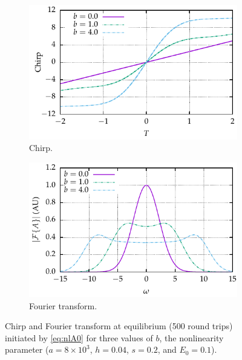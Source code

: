 \documentclass[9pt,twocolumn,twoside]{osajnl}
\begin{document}
\begin{figure}[tbp]
	\centering
	\begin{subfigure}{\columnwidth}
		\centering
		\includegraphics{Figures/Chirp}
		\caption{Chirp.}
		\label{fig:chirp}
	\end{subfigure} %
	\begin{subfigure}{\columnwidth}
		\centering
		\includegraphics{Figures/FT}
		\caption{Fourier transform.}
		\label{fig:ft}
	\end{subfigure}
	\caption{Chirp and Fourier transform at equilibrium (500 round trips) initiated by \eqref{eq:nlA0} for three values of $b$, the nonlinearity parameter ($a = 8 \times 10^3$, $h = 0.04$, $s = 0.2$, and $E_0 = 0.1$).}
	\label{fig:chirpft}
\end{figure}
\end{document}
